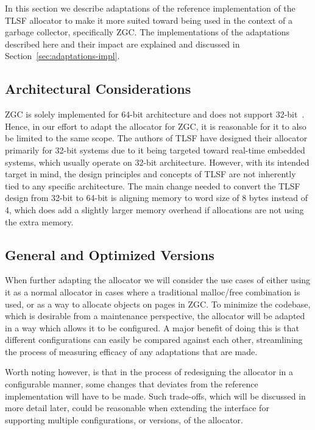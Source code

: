 In this section we describe adaptations of the reference implementation of the TLSF allocator to make it more suited toward being used in the context of a garbage collector, specifically ZGC. The implementations of the adaptations described here and their impact are explained and discussed in Section~\ref{sec:adaptations-impl}.

\subsection{Architectural Considerations}

ZGC is solely implemented for 64-bit architecture and does not support 32-bit~\cite{zgc_deep_dive}. Hence, in our effort to adapt the allocator for ZGC, it is reasonable for it to also be limited to the same scope. The authors of TLSF have designed their allocator primarily for 32-bit systems due to it being targeted toward real-time embedded systems, which usually operate on 32-bit architecture. However, with its intended target in mind, the design principles and concepts of TLSF are not inherently tied to any specific architecture. The main change needed to convert the TLSF design from 32-bit to 64-bit is aligning memory to word size of 8 bytes instead of 4, which does add a slightly larger memory overhead if allocations are not using the extra memory.

\subsection{General and Optimized Versions}

When further adapting the allocator we will consider the use cases of either using it as a normal allocator in cases where a traditional malloc/free combination is used, or as a way to allocate objects on pages in ZGC. To minimize the codebase, which is desirable from a maintenance perspective, the allocator will be adapted in a way which allows it to be configured. A major benefit of doing this is that different configurations can easily be compared against each other, streamlining the process of measuring efficacy of any adaptations that are made.

Worth noting however, is that in the process of redesigning the allocator in a configurable manner, some changes that deviates from the reference implementation will have to be made. Such trade-offs, which will be discussed in more detail later, could be reasonable when extending the interface for supporting multiple configurations, or versions, of the allocator.


